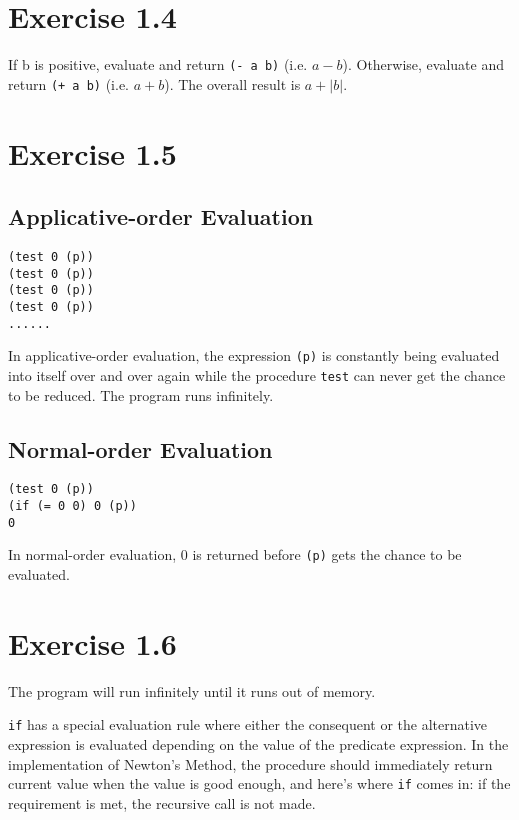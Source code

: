 \documentclass[../main.tex]{subfiles}
\begin{document}
\section{Exercise 1.4}

If b is positive, evaluate and return \lstinline{(- a b)} (i.e. $a - b$).
 Otherwise, evaluate and return \lstinline{(+ a b)} (i.e. $a + b$).
 The overall result is $a + |b|$.

\section{Exercise 1.5}

\subsection*{Applicative-order Evaluation}

\begin{lstlisting}
(test 0 (p))
(test 0 (p))
(test 0 (p))
(test 0 (p))
......
\end{lstlisting}

In applicative-order evaluation, the expression \lstinline{(p)}
 is constantly being evaluated into itself over and over again while
 the procedure \lstinline{test} can never get the chance to be reduced.
 The program runs infinitely.

\subsection*{Normal-order Evaluation}

\begin{lstlisting}
(test 0 (p))
(if (= 0 0) 0 (p))
0
\end{lstlisting}

In normal-order evaluation, 0 is returned before \lstinline{(p)} gets
 the chance to be evaluated.

\section{Exercise 1.6}

The program will run infinitely until it runs out of memory.

\lstinline{if} has a special evaluation rule where either the consequent
 or the alternative expression is evaluated depending on the value of
 the predicate expression. In the implementation of Newton's Method,
 the procedure should immediately return current value when the value
 is good enough, and here's where \lstinline{if} comes in: if the
 requirement is met, the recursive call is not made.
 
\end{document}
